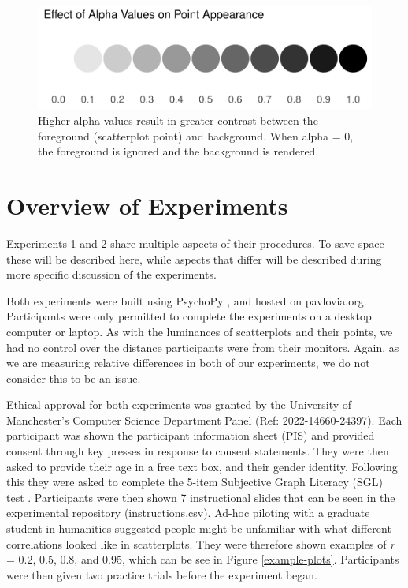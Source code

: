 \documentclass[preprint, 3p,
authoryear]{elsarticle} %
\begin{document}
\begin{figure}

\includegraphics[width=0.5\linewidth]{contrast_and_scatterplots_files/figure-latex/formal-contrast-1} \hfill{}

\caption{\label{formal-contrast}Higher alpha values result in greater contrast between the foreground (scatterplot point) and background. When alpha = 0, the foreground is ignored and the background is rendered.}\label{fig:formal-contrast}
\end{figure}

\hypertarget{overview-of-experiments}{%
\section{Overview of Experiments}\label{overview-of-experiments}}

Experiments 1 and 2 share multiple aspects of their procedures. To save
space these will be described here, while aspects that differ will be
described during more specific discussion of the experiments.

Both experiments were built using PsychoPy \citep{pierce_psychopy_2019},
and hosted on pavlovia.org. Participants were only permitted to complete
the experiments on a desktop computer or laptop. As with the luminances
of scatterplots and their points, we had no control over the distance
participants were from their monitors. Again, as we are measuring
relative differences in both of our experiments, we do not consider this
to be an issue.

Ethical approval for both experiments was granted by the University of
Manchester's Computer Science Department Panel (Ref: 2022-14660-24397).
Each participant was shown the participant information sheet (PIS) and
provided consent through key presses in response to consent statements.
They were then asked to provide their age in a free text box, and their
gender identity. Following this they were asked to complete the 5-item
Subjective Graph Literacy (SGL) test \citep{garcia_2016}. Participants
were then shown 7 instructional slides that can be seen in the
experimental repository (instructions.csv). Ad-hoc piloting with a
graduate student in humanities suggested people might be unfamiliar with
what different correlations looked like in scatterplots. They were
therefore shown examples of \emph{r} = 0.2, 0.5, 0.8, and 0.95, which
can be see in Figure \ref{example-plots}. Participants were then given
two practice trials before the experiment began.
\end{document}

